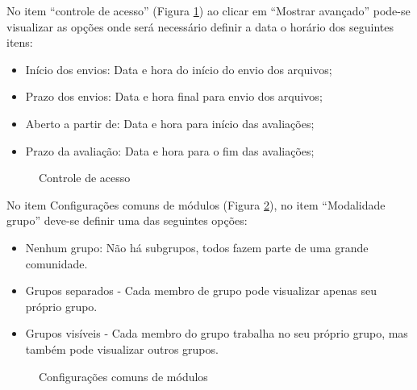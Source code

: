 No item “controle de acesso” (Figura \ref{fig:controle_acess}) ao clicar em “Mostrar avançado” pode-se visualizar as opções onde será necessário definir a data o horário dos seguintes itens:

\begin{itemize}
 \item Início dos envios: Data e hora do início do envio dos arquivos;
 \item Prazo dos envios: Data e hora final para envio dos arquivos;
 \item Aberto a partir de: Data e hora para início das avaliações;
 \item Prazo da avaliação: Data e hora para o fim das avaliações;
\end{itemize}

\begin{figure}
 \begin{center}
  \caption{Controle de acesso}
  \label{fig:controle_acess}
 \end{center}
\end{figure}

No item Configurações comuns de módulos (Figura \ref{fig:controle_comum}), no item “Modalidade grupo” deve-se definir uma das seguintes opções:

\begin{itemize}
 \item Nenhum grupo: Não há subgrupos, todos fazem parte de uma grande comunidade.
 \item Grupos separados - Cada membro de grupo pode visualizar apenas seu próprio grupo.
 \item Grupos visíveis - Cada membro do grupo trabalha no seu próprio grupo, mas também pode visualizar outros grupos.
\end{itemize}

\begin{figure}
 \begin{center}
  \caption{Configurações comuns de módulos}
  \label{fig:controle_comum}
 \end{center}
\end{figure}

